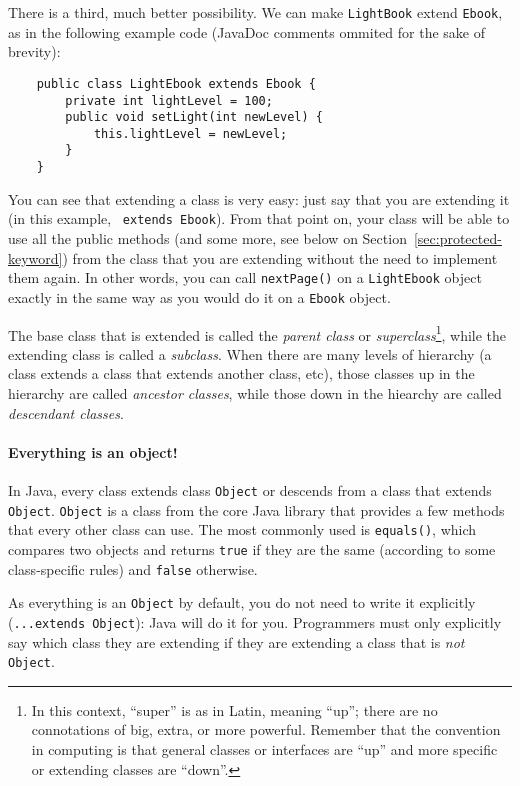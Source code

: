 There is a third, much better possibility. We can make
\verb+LightBook+ extend \verb+Ebook+, as in the following example code 
(JavaDoc comments ommited for the sake of brevity): 

\begin{verbatim}
    public class LightEbook extends Ebook {
        private int lightLevel = 100;
        public void setLight(int newLevel) {
            this.lightLevel = newLevel;
        }
    }
\end{verbatim}

You can see that extending a class is very easy: just say that you are
extending it (in this example, ~\verb+extends Ebook+).
From that point on, your class will be able to use all the public methods (and
some more, see below on Section~\ref{sec:protected-keyword}) from
the class that you are extending without the need to implement them
again. In other words, you can call \verb+nextPage()+ on a
\verb+LightEbook+ object exactly in the same way as you would do it
on a \verb+Ebook+ object. 

The base class that is extended is called the \emph{parent class} or
\emph{superclass}\footnote{In this context, ``super'' is as in Latin,
  meaning ``up''; there are no connotations of big, extra, or more
  powerful. Remember that the convention in computing is that general
  classes or interfaces are ``up'' and more specific or extending classes
  are ``down''.}, 
while the extending class is called a \emph{subclass}. When there are
many levels of hierarchy (a class extends a class that extends another
class, etc), those classes up in the hierarchy are called
\emph{ancestor classes}, while those down in the hiearchy are called
\emph{descendant classes}. 

\paragraph{Everything is an object!}
\label{sec:everything-an-object}

In Java, every class extends class \verb+Object+ or descends from a
class that extends \verb+Object+. \verb+Object+ is a class from the
core Java library that provides a few methods that every other class
can use. The most commonly used is \verb+equals()+, which compares two
objects and returns \verb+true+ if they are the same (according to
some class-specific rules) and \verb+false+ otherwise. 

As everything is an \verb+Object+ by default, you do not need to write
it explicitly (\verb+...extends Object+): Java will do it for
you. Programmers must only explicitly say which class they are
extending if they are extending a class that is \emph{not} \verb+Object+.

